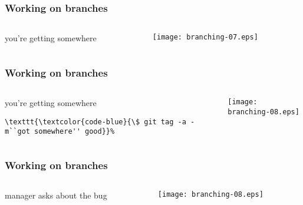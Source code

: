 \documentclass[english]{beamer}
\newcommand{\CMD}[1]{%
\texttt{\textcolor{code-blue}{#1}}%
}
\begin{document}
\begin{frame}
\frametitle{Working on branches}

\begin{columns}[t]
        \begin{column}[T]{.5\textwidth}
                you're getting somewhere
        \end{column}
        \begin{column}[T]{.5\textwidth}
                \texttt{[image: branching-07.eps]}
        \end{column}
\end{columns}
\end{frame}

\begin{frame}[fragile]
\frametitle{Working on branches}

\begin{columns}[t]
        \begin{column}[T]{.5\textwidth}
                you're getting somewhere

                \vspace{\baselineskip}
                {\small
                \begin{Verbatim}[commandchars=\\\{\}]
\CMD{\$ git tag -a -m``got somewhere'' good}
                \end{Verbatim}
                }
        \end{column}
        \begin{column}[T]{.5\textwidth}
                \texttt{[image: branching-08.eps]}
        \end{column}
\end{columns}
\end{frame}

\begin{frame}[fragile]
\frametitle{Working on branches}

\begin{columns}[t]
        \begin{column}[T]{.5\textwidth}
                manager asks about the bug
        \end{column}
        \begin{column}[T]{.5\textwidth}
                \texttt{[image: branching-08.eps]}
        \end{column}
\end{columns}
\end{frame}
\end{document}
